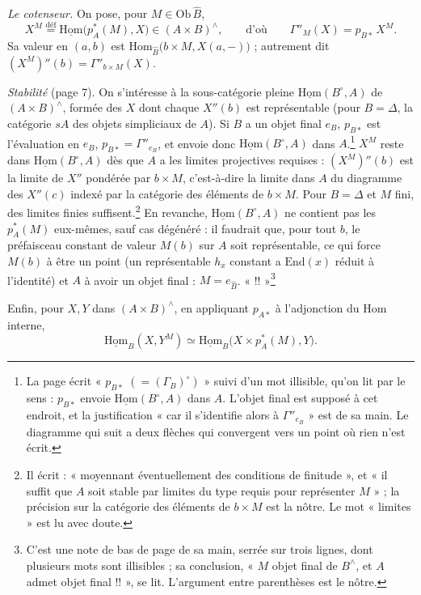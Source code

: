 \documentclass[11pt,a4paper]{article}
\begin{document}
\emph{Le cotenseur.} On pose, pour $M \in \mathrm{Ob}\, \widehat{B}$,
\[
X^{M} \overset{\text{déf}}{=} \underline{\mathrm{Hom}}\bigl(p_{A}^{*}(M),
X\bigr) \in (A \times B)^{\wedge},
\qquad \text{d'où} \qquad \Gamma''_{M}(X) = p_{B*}\, X^{M}.
\]
Sa valeur en $(a, b)$ est $\mathrm{Hom}_{\widehat{B}}\bigl(b \times M, X(a,
-)\bigr)$ ; autrement dit $(X^{M})'' (b) = \Gamma''_{b \times M}(X)$.

\emph{Stabilité} (page 7). On s'intéresse à la sous-catégorie pleine
$\underline{\mathrm{Hom}}(B^{\circ}, A)$ de $(A \times B)^{\wedge}$, formée des
$X$ dont chaque $X''(b)$ est représentable (pour $B = \Delta$, la catégorie
$sA$ des objets simpliciaux de $A$). Si $B$ a un objet final $e_{B}$, $p_{B*}$
est l'évaluation en $e_{B}$, $p_{B*} = \Gamma''_{e_{B}}$, et envoie donc
$\underline{\mathrm{Hom}}(B^{\circ}, A)$ dans $A$.\footnote{La page écrit
« $p_{B*}$ $(= (\Gamma_{B})^{\circ})$ » suivi d'un mot illisible, qu'on lit
par le sens : $p_{B*}$ envoie $\underline{\mathrm{Hom}}(B^{\circ}, A)$ dans $A$.
L'objet final est supposé à cet endroit, et la justification « car il
s'identifie alors à $\Gamma''_{e_{B}}$ » est de sa main. Le diagramme qui
suit a deux flèches qui convergent vers un point où rien n'est écrit.}
$X^{M}$ reste dans $\underline{\mathrm{Hom}}(B^{\circ}, A)$ dès que $A$ a les
limites projectives requises : $(X^{M})''(b)$ est la limite de $X''$ pondérée
par $b \times M$, c'est-à-dire la limite dans $A$ du diagramme des
$X''(c)$ indexé par la catégorie des éléments de $b \times M$. Pour $B =
\Delta$ et $M$ fini, des limites finies suffisent.\footnote{Il écrit :
« moyennant éventuellement des conditions de finitude », et « il suffit que $A$
soit stable par limites du type requis pour représenter $M$ » ; la précision
sur la catégorie des éléments de $b \times M$ est la nôtre. Le mot
« limites » est lu avec doute.} En revanche,
$\underline{\mathrm{Hom}}(B^{\circ}, A)$ ne contient pas les $p_{A}^{*}(M)$
eux-mêmes, sauf cas dégénéré : il faudrait que, pour tout $b$, le préfaisceau
constant de valeur $M(b)$ sur $A$ soit représentable, ce qui force $M(b)$ à
être un point (un représentable $h_{x}$ constant a $\mathrm{End}(x)$ réduit
à l'identité) et $A$ à avoir un objet final : $M = e_{\widehat{B}}$.
« !! »\footnote{C'est une note de bas de page de sa main, serrée sur trois
lignes, dont plusieurs mots sont illisibles ; sa conclusion, « $M$ objet
final de $B^{\wedge}$, et $A$ admet objet final !! », se lit. L'argument entre
parenthèses est le nôtre.}

Enfin, pour $X, Y$ dans $(A \times B)^{\wedge}$, en appliquant $p_{A*}$ à
l'adjonction du Hom interne,
\[
\underline{\mathrm{Hom}}_{B}(X, Y^{M}) \simeq
\underline{\mathrm{Hom}}_{B}\bigl(X \times p_{A}^{*}(M), Y\bigr).
\]
\end{document}
